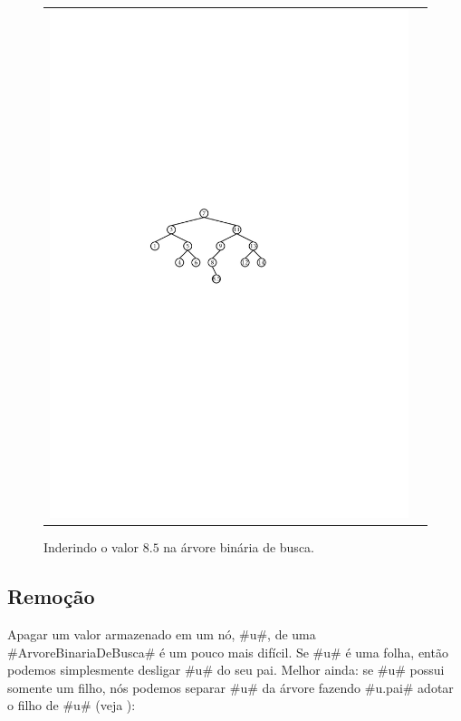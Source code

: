 \begin{figure}
\begin{center}
\begin{tabular}{cc}
    \includegraphics[width=\HalfScaleIfNeeded]{figs/bst-example-5} 
    \end{tabular}
  \end{center}
  \caption{Inderindo o valor $8.5$ na árvore binária de busca.}
\end{figure}


\subsection{Remoção}

Apagar um valor armazenado em um nó, #u#, de uma #ArvoreBinariaDeBusca# é um pouco mais difícil.  Se #u# é uma folha, então podemos simplesmente desligar #u# do seu pai.  Melhor ainda: se #u# possui somente um filho, nós podemos separar #u# da árvore fazendo #u.pai# adotar o filho de #u# (veja
):

